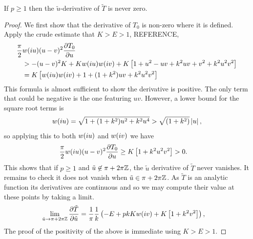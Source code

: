 \documentclass{article}
\begin{document}
\begin{lem}
If $p \geq 1$ then the $\tilde{u}$-derivative of $\tilde{T}$ is never zero.
\label{lem:dTdu_nonzero}

\begin{proof}
We first show that the derivative of $T_0$ is non-zero where it is defined. Apply the crude estimate that $K>E>1$,
REFERENCE,
\begin{align*}
\frac{\pi}{2}&w(i u)(u-v)^2\frac{\partial T_0}{\partial u}\\
&> -(u-v)^2 K + Kw(i u)w(i v) + K\left[ 1 + u^2 - uv + k^2 uv + v^2 + k^2 u^2 v^2 \right] \\
&= K \left[ w(i u)w(i v) + 1 + (1 + k^2) uv + k^2 u^2 v^2 \right]
\end{align*}
This formula is almost sufficient to show the derivative is positive. The only term that could be negative is the one featuring $uv$. However, a lower bound for the square root terms is
\[
w(i u) = \sqrt{1 + (1+k^2)u^2 + k^2u^4} > \sqrt{(1+k^2)}\left|u\right|,
\]
so applying this to both $w(i u)$ and $w(i v)$ we have
\begin{align*}
\frac{\pi}{2}w(i u)(u-v)^2\frac{\partial T_0}{\partial u}
&\geq K \left[ 1 + k^2 u^2 v^2 \right] >0.
\end{align*}
This shows that if $p\geq 1$ and $\tilde{u} \not\in \pi + 2\pi\mathbb{Z}$, the $\tilde{u}$ derivative of $\tilde{T}$ never vanishes. It remains to check it does not vanish when $\tilde{u} \in \pi + 2\pi\mathbb{Z}$. As $\tilde{T}$ is an analytic function its derivatives are continuous and so we may compute their value at these points by taking a limit.
\begin{align*}
\lim_{\tilde{u}\to \pi + 2\pi\mathbb{Z}} \frac{\partial \tilde{T}}{\partial \tilde{u}}
&=\frac{1}{\pi} \frac{1}{k} \left(-E + pkKw(i v) + K\left[ 1 + k^2v^2 \right]\right),
\end{align*}
The proof of the positivity of the above is immediate using $K>E>1$.
\end{proof}
\end{lem}
\end{document}
